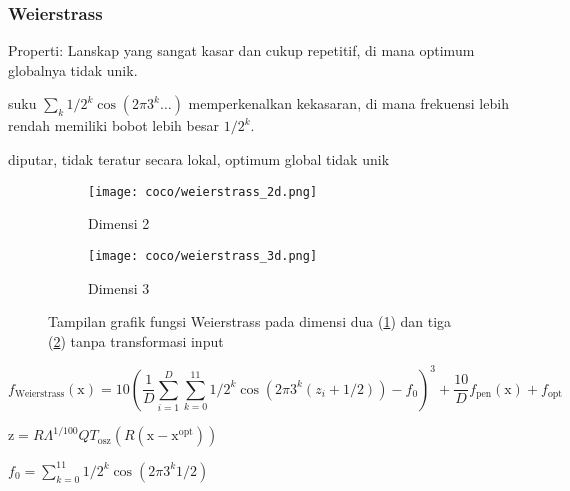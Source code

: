 \subsubsection{Weierstrass}
\noindent Properti:
Lanskap yang sangat kasar dan cukup repetitif, di mana optimum globalnya tidak unik.
\begin{packed_item}
  \item suku $\sum_{k}^{}1/2^k\cos(2\pi 3^k\ldots)$ memperkenalkan kekasaran, di mana frekuensi lebih rendah memiliki bobot lebih besar $1/2^k$.
  \item diputar, tidak teratur secara lokal, optimum global tidak unik
\end{packed_item}
\begin{figure}[H]
	\centering
	\begin{subfigure}[b]{0.4\textwidth}
		\centering
		\texttt{[image: coco/weierstrass\_2d.png]}
		\caption{Dimensi 2}
		\label{fig:weierstrass_coco_2d}
	\end{subfigure}
	\hfill
	\begin{subfigure}[b]{0.4\textwidth}
		\centering
		\texttt{[image: coco/weierstrass\_3d.png]}
		\caption{Dimensi 3}
		\label{fig:weierstrass_coco_3d}
	\end{subfigure}
	\caption{Tampilan grafik fungsi Weierstrass pada dimensi dua (\cref{fig:weierstrass_coco_2d}) dan tiga (\cref{fig:weierstrass_coco_3d}) tanpa transformasi input}
	\label{fig:weierstrass_coco}
\end{figure}
\begin{equation}
  f_{\text{Weierstrass}}(\mathrm{x})=10(\frac{1}{D}\sum_{i=1}^{D}\sum_{k=0}^{11}1/2^k\cos(2\pi 3^k(z_i+1/2))-f_{0})^3+\frac{10}{D}f_{\text{pen}}(\mathrm{x})+f_{\text{opt}}
\end{equation}
\begin{packed_item}
    \item $\mathrm{z}=R\Lambda^{1/100}QT_{\text{osz}}(R(\mathrm{x}-\mathrm{x}^{\text{opt}}))$
    \item $f_0=\sum_{k=0}^{11}1/2^k\cos(2\pi 3^k1/2)$
\end{packed_item}

